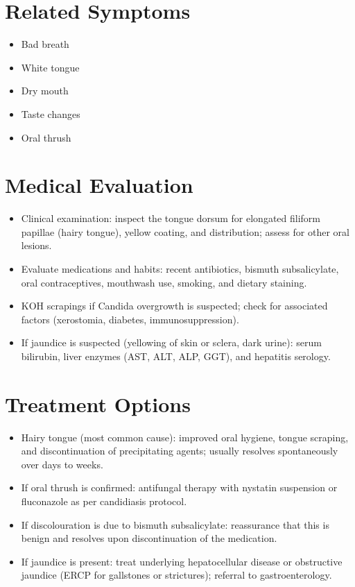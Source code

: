 \section*{Related Symptoms}
\begin{itemize}
  \item Bad breath
  \item White tongue
  \item Dry mouth
  \item Taste changes
  \item Oral thrush
\end{itemize}


\section*{Medical Evaluation}
\begin{itemize}
  \item Clinical examination: inspect the tongue dorsum for elongated filiform papillae (hairy tongue), yellow coating, and distribution; assess for other oral lesions.
  \item Evaluate medications and habits: recent antibiotics, bismuth subsalicylate, oral contraceptives, mouthwash use, smoking, and dietary staining.
  \item KOH scrapings if Candida overgrowth is suspected; check for associated factors (xerostomia, diabetes, immunosuppression).
  \item If jaundice is suspected (yellowing of skin or sclera, dark urine): serum bilirubin, liver enzymes (AST, ALT, ALP, GGT), and hepatitis serology.
\end{itemize}

\section*{Treatment Options}
\begin{itemize}
  \item Hairy tongue (most common cause): improved oral hygiene, tongue scraping, and discontinuation of precipitating agents; usually resolves spontaneously over days to weeks.
  \item If oral thrush is confirmed: antifungal therapy with nystatin suspension or fluconazole as per candidiasis protocol.
  \item If discolouration is due to bismuth subsalicylate: reassurance that this is benign and resolves upon discontinuation of the medication.
  \item If jaundice is present: treat underlying hepatocellular disease or obstructive jaundice (ERCP for gallstones or strictures); referral to gastroenterology.
\end{itemize}

